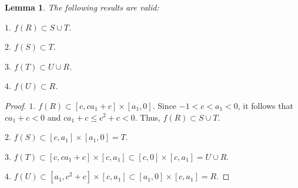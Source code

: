 \documentclass[11pt]{amsart}
\newtheorem{lemma}[theorem]{Lemma}
\theoremstyle{definition}
\begin{document}
\begin{lemma}
	The following results are valid:
	
	\noindent $1.$ $f(R)\subset S\cup T$.
	
	\noindent $2.$ $f(S)\subset T$.
	
	\noindent $3.$ $f(T)\subset U\cup R$.
	
	\noindent $4.$ $f(U)\subset R$. \label{lema4}
\end{lemma}
\begin{proof} $1.$ $f(R)\subset [c,ca_1+c]\times [a_1,0]$. Since $-1<c<a_1<0$, it follows that $ca_1+c<0$ and $ca_1+c\leq c^2+c<0$. Thus, $f(R)\subset S\cup T$.
	
	\noindent $2.$ $f(S)\subset [c,a_1]\times [a_1,0]= T$.
	
	\noindent $3.$ $f(T)\subset [c,ca_1+c]\times[c,a_1]\subset [c,0]\times[c,a_1]= U\cup R$.
	
	\noindent $4.$ $f(U)\subset [a_1,c^2+c]\times[c,a_1]\subset [a_1,0]\times[c,a_1]= R$.
\end{proof}
\end{document}
